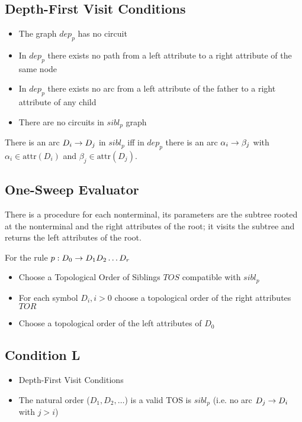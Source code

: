 \subsection{Depth-First Visit Conditions}
\begin{itemize}
    \item The graph $dep_p$ has no circuit
    \item In $dep_p$ there exists no path from a left attribute to a right attribute of the same node
    \item In $dep_p$ there exists no arc from a left attribute of the father to a right attribute of any child
    \item There are no circuits in $sibl_p$ graph
\end{itemize}

There is an arc $D_i \rightarrow D_j$ in $sibl_p$ iff in $dep_p$ there is an arc $\alpha_i \rightarrow \beta_j$ with $\alpha_i \in \text{attr}(D_i)$ and $\beta_j \in \text{attr}(D_j)$.

\subsection{One-Sweep Evaluator}
There is a procedure for each nonterminal, its parameters are the subtree rooted at the nonterminal and the right attributes of the root; it visits the subtree and returns the left attributes of the root.

For the rule $p: D_0 \rightarrow D_1D_2\ldots D_r$
\begin{itemize}
    \item Choose a Topological Order of Siblings $TOS$ compatible with $sibl_p$
    \item For each symbol $D_i, i>0$ choose a topological order of the right attributes $TOR$
    \item Choose a topological order of the left attributes of $D_0$
\end{itemize}

\subsection{Condition L}

\begin{itemize}
    \item Depth-First Visit Conditions
    \item The natural order ($D_1, D_2, \ldots$) is a valid TOS is $sibl_p$ (i.e. no arc $D_j\rightarrow D_i$ with $j>i$)
\end{itemize}
